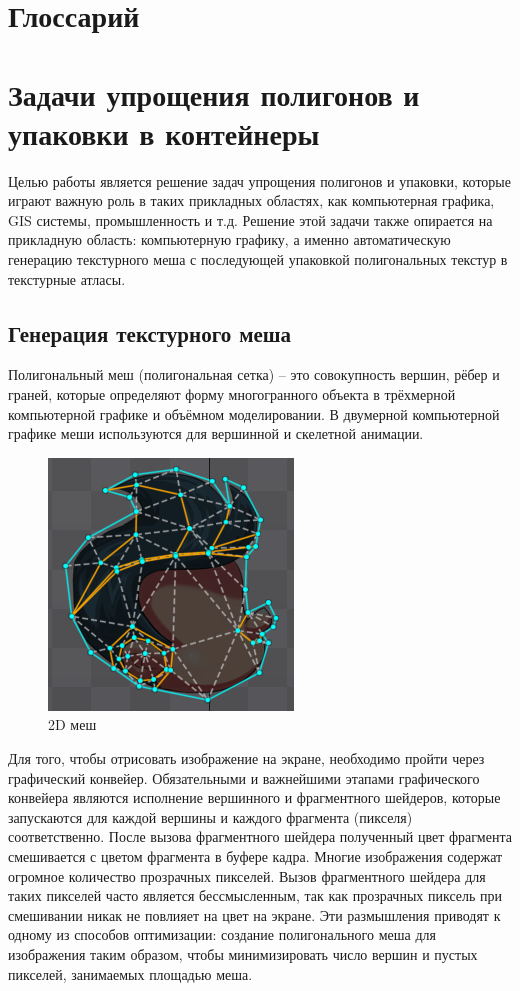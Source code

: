 \documentclass{fefu_thesis/cls/fefu}
\begin{document}
    \section*{Глоссарий}
    \section{Задачи упрощения полигонов и упаковки в контейнеры}

    Целью работы является решение задач упрощения полигонов и упаковки, которые играют важную роль в таких прикладных областях, как компьютерная графика, GIS системы, промышленность и т.д. Решение этой задачи также опирается на прикладную область: компьютерную графику, а именно автоматическую генерацию текстурного меша с последующей упаковкой полигональных текстур в текстурные атласы.

    \subsection{Генерация текстурного меша}

    Полигональный меш (полигональная сетка) -- это совокупность вершин, рёбер и граней, которые определяют форму многогранного объекта в трёхмерной компьютерной графике и объёмном моделировании. В двумерной компьютерной графике меши используются для вершинной и скелетной анимации.

    \begin{figure}[H]
        \centering
        \includegraphics[scale=0.5]{images/spine_mesh.png}
        \caption{2D меш}
    \end{figure}

    Для того, чтобы отрисовать изображение на экране, необходимо пройти через графический конвейер. Обязательными и важнейшими этапами графического конвейера являются исполнение вершинного и фрагментного шейдеров, которые запускаются для каждой вершины и каждого фрагмента (пикселя) соответственно. После вызова фрагментного шейдера полученный цвет фрагмента смешивается с цветом фрагмента в буфере кадра. Многие изображения содержат огромное количество прозрачных пикселей. Вызов фрагментного шейдера для таких пикселей часто является бессмысленным, так как прозрачных пиксель при смешивании никак не повлияет на цвет на экране.
    Эти размышления приводят к одному из способов оптимизации: создание полигонального меша для изображения таким образом, чтобы минимизировать число вершин и пустых пикселей, занимаемых площадью меша.
\end{document}

